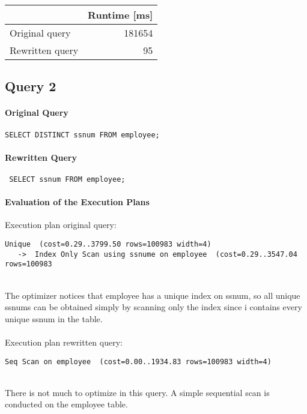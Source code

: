 \documentclass[11pt]{scrartcl}
\begin{document}
\begin{table}[H]
  \begin{tabular}{l|r}
    & Runtime [ms] \\
   \hline
    Original query & 181654 \\
    Rewritten query & 95 \\
  \end{tabular}
\end{table}

\newpage
\subsection*{Query 2}

\paragraph{Original Query}

{\small
\begin{verbatim}
SELECT DISTINCT ssnum FROM employee;
\end{verbatim}
}

\paragraph{Rewritten Query}

{\small
\begin{verbatim}
 SELECT ssnum FROM employee;
\end{verbatim}
}

\paragraph{Evaluation of the Execution Plans}

Execution plan original query:

\begin{verbatim}
Unique  (cost=0.29..3799.50 rows=100983 width=4)
   ->  Index Only Scan using ssnume on employee  (cost=0.29..3547.04 rows=100983
\end{verbatim}
\ \\
The optimizer notices that employee has a unique index on ssnum, so all unique ssnums can be obtained simply by scanning only the index since i contains every unique ssnum in the table.
\\
\\
Execution plan rewritten query:

\begin{verbatim}
Seq Scan on employee  (cost=0.00..1934.83 rows=100983 width=4)
\end{verbatim}
\ \\
There is not much to optimize in this query. A simple sequential scan is conducted on the employee table.
\end{document}
